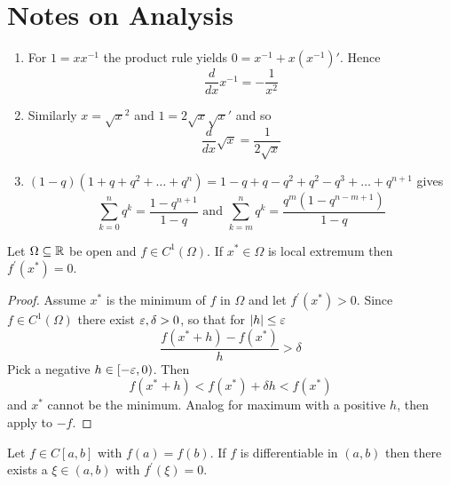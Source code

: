 
\newpage
\section{Notes on Analysis}

\begin{lemma}\hfill
    \begin{enumerate}
        \item For \( 1 = x x^{-1} \) the product rule yields \( 0 = x^{-1} + x(x^{-1})' \). Hence
            \[
                \frac{d}{dx} x^{-1} = -\frac{1}{x^2}
            \]
        \item Similarly \( x = \sqrt{x}^2 \) and \( 1 = 2 \sqrt{x} \sqrt{x}' \) and so
            \[
                \frac{d}{dx} \sqrt{x} = \frac{1}{2\sqrt{x}}
            \]
        \item \( (1 - q) (1 + q + q^2 + \ldots + q^n) = 1 - q + q - q^2 + q^2 - q^3 + \ldots + q^{n+1} \) gives
            \[
                \sum_{k=0}^n q^k = \frac{1 - q^{n+1}}{1 - q} \text { and }
                \sum_{k=m}^n q^k = \frac{q^m(1 - q^{n-m+1})}{1 - q}
            \]

    \end{enumerate}
\end{lemma}
\bigskip

\begin{theorem}\label{thm:fermat_stationary_point}
Let \( \Omega \subseteq \mathbb{R} \) be open and \( f \in C^1(\Omega) \). If \( x^* \in \Omega \) is local extremum 
then \( f^\prime(x^*) = 0 \).
\end{theorem}

\begin{proof}
Assume \( x^* \) is the minimum of \( f \) in \( \Omega \) and let \( f^\prime(x^*) > 0 \). 
Since \( f \in C^1(\Omega) \) there exist \( \varepsilon, \delta > 0 \), so that for \( |h| \le \varepsilon \)
\[
    \frac{f(x^* + h) - f(x^*)}{h} > \delta
\]
Pick a negative \( h \in [-\varepsilon, 0) \). Then 
\[
     f(x^* + h) < f(x^*) +  \delta h < f(x^*) 
\]
and \( x^* \) cannot be the minimum. Analog for maximum with a positive \( h \), then apply to \( -f \).
\end{proof}
\bigskip


\begin{theorem}[Rolle]\label{thm:rolle}
Let \( f \in C[a,b] \) with \( f(a) = f(b) \). If \( f \) is differentiable in \( (a, b) \) then 
there exists a \( \xi \in (a,b) \) with \( f^\prime(\xi) = 0 \).
\end{theorem}

